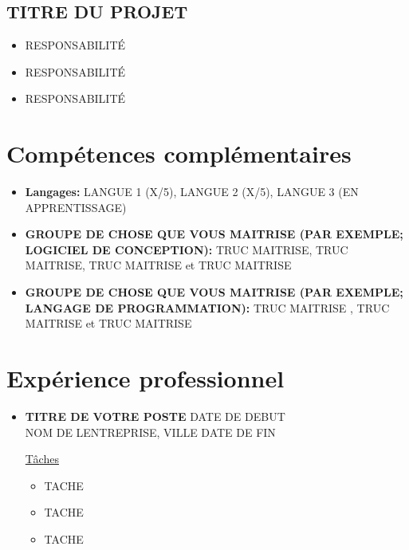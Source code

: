 \documentclass[twoside,letterpaper,11  pt]{article}
\begin{document}
\begin{flushleft}
\subsection*{TITRE DU PROJET}
\begin{itemize}[label=\textbullet, font=  \scriptsize]
    \item RESPONSABILITÉ
    \item RESPONSABILITÉ
    \item RESPONSABILITÉ
\end{itemize}

\section*{Compétences complémentaires} %

\begin{itemize}[label={}]

\item \textbf{Langages:} LANGUE 1 (X/5), LANGUE 2 (X/5), LANGUE 3 (EN APPRENTISSAGE)
\item \textbf{GROUPE DE CHOSE QUE VOUS MAITRISE (PAR EXEMPLE; LOGICIEL DE CONCEPTION):} TRUC MAITRISE, TRUC MAITRISE, TRUC MAITRISE et TRUC MAITRISE
\item \textbf{GROUPE DE CHOSE QUE VOUS MAITRISE (PAR EXEMPLE; LANGAGE DE PROGRAMMATION):} TRUC MAITRISE , TRUC MAITRISE  et TRUC MAITRISE
\end{itemize}

\clearpage

\section*{Expérience professionnel}%

\begin{itemize}[label={}]
\item \textbf{TITRE DE VOTRE POSTE} \hfill   DATE DE DEBUT\\
NOM DE LENTREPRISE, VILLE \hfill DATE DE FIN\\

\smallbreak

\underline{Tâches}\\ %
\begin{itemize}[label=\textbullet, font=  \scriptsize]
    \item TACHE
    \item TACHE
    \item TACHE
\end{itemize}



\end{itemize}
\end{flushleft}
\end{document}
